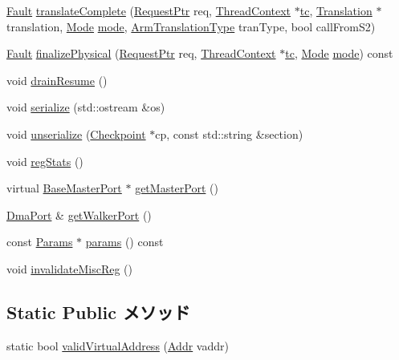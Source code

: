 \begin{DoxyCompactItemize}
\item 
\hyperlink{classRefCountingPtr}{Fault} \hyperlink{classArmISA_1_1TLB_adc8f6be2e370d6ce03ae8044ff6f8709}{translateComplete} (\hyperlink{classRequest}{RequestPtr} req, \hyperlink{classThreadContext}{ThreadContext} $\ast$\hyperlink{namespaceArmISA_a5aff829af55e65b802d83dfcef4e9dd0}{tc}, \hyperlink{classBaseTLB_1_1Translation}{Translation} $\ast$translation, \hyperlink{classBaseTLB_a46c8a310cf4c094f8c80e1cb8dc1f911}{Mode} \hyperlink{namespaceArmISA_a5f3b9b97eb2dfa29d33e74878455f90d}{mode}, \hyperlink{classArmISA_1_1TLB_ad6f5d480df151d5bddeefc6271793f08}{ArmTranslationType} tranType, bool callFromS2)
\item 
\hyperlink{classRefCountingPtr}{Fault} \hyperlink{classArmISA_1_1TLB_ae199d95c42e036851a8a0543c6d6d2e3}{finalizePhysical} (\hyperlink{classRequest}{RequestPtr} req, \hyperlink{classThreadContext}{ThreadContext} $\ast$\hyperlink{namespaceArmISA_a5aff829af55e65b802d83dfcef4e9dd0}{tc}, \hyperlink{classBaseTLB_a46c8a310cf4c094f8c80e1cb8dc1f911}{Mode} \hyperlink{namespaceArmISA_a5f3b9b97eb2dfa29d33e74878455f90d}{mode}) const 
\item 
void \hyperlink{classArmISA_1_1TLB_a8f020d3237536fe007fc488c4125c5d8}{drainResume} ()
\item 
void \hyperlink{classArmISA_1_1TLB_a53e036786d17361be4c7320d39c99b84}{serialize} (std::ostream \&os)
\item 
void \hyperlink{classArmISA_1_1TLB_af22e5d6d660b97db37003ac61ac4ee49}{unserialize} (\hyperlink{classCheckpoint}{Checkpoint} $\ast$cp, const std::string \&section)
\item 
void \hyperlink{classArmISA_1_1TLB_a4dc637449366fcdfc4e764cdf12d9b11}{regStats} ()
\item 
virtual \hyperlink{classBaseMasterPort}{BaseMasterPort} $\ast$ \hyperlink{classArmISA_1_1TLB_a2ea87b216b1f58953a679590672be258}{getMasterPort} ()
\item 
\hyperlink{classDmaPort}{DmaPort} \& \hyperlink{classArmISA_1_1TLB_a3eca666205fdb5a79565d7520a5c97b9}{getWalkerPort} ()
\item 
const \hyperlink{classSimObject_a0f0761d2db586a23bb2a2880b8f387bb}{Params} $\ast$ \hyperlink{classArmISA_1_1TLB_acd3c3feb78ae7a8f88fe0f110a718dff}{params} () const 
\item 
void \hyperlink{classArmISA_1_1TLB_a97b2a677e1ca5219c876aa978a853c15}{invalidateMiscReg} ()
\end{DoxyCompactItemize}
\subsection*{Static Public メソッド}
\begin{DoxyCompactItemize}
\item 
static bool \hyperlink{classArmISA_1_1TLB_a3e576c3e0d39dfca708baea44ebf0617}{validVirtualAddress} (\hyperlink{classm5_1_1params_1_1Addr}{Addr} vaddr)
\end{DoxyCompactItemize}
